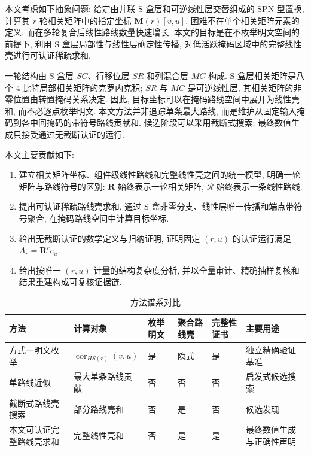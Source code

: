 \documentclass[UTF8,a4paper,zihao=-4,fontset=fandol]{ctexart}
\numberwithin{equation}{section}
\theoremstyle{definition}
\theoremstyle{plain}
\theoremstyle{remark}
\newcommand{\Route}{\mathcal{R}}
\newcommand{\cor}{\operatorname{cor}}
\begin{document}
本文考虑如下抽象问题: 给定由并联 S 盒层和可逆线性层交替组成的 SPN 型置换, 计算其 $r$ 轮相关矩阵中的指定坐标 $\bm{M}(r)[v,u]$. 困难不在单个相关矩阵元素的定义, 而在多轮复合后线性路线数量快速增长. 本文的目标是在不枚举明文空间的前提下, 利用 S 盒层局部性与线性层确定性传播, 对低活跃掩码区域中的完整线性壳进行可认证稀疏求和.

一轮结构由 S 盒层 $SC$、行移位层 $SR$ 和列混合层 $MC$ 构成. S 盒层相关矩阵是八个 4 比特局部相关矩阵的克罗内克积; $SR$ 与 $MC$ 是可逆线性层, 其相关矩阵的非零位置由转置掩码关系决定. 因此, 目标坐标可以在掩码路线空间中展开为线性壳和, 而不必逐点枚举明文. 本文方法并非追踪单条最大路线, 而是维护从固定输入掩码到各中间掩码的带符号路线贡献和. 候选阶段可以采用截断式搜索; 最终数值生成只接受通过无截断认证的运行.

本文主要贡献如下:
\begin{enumerate}[label=\arabic*.,leftmargin=2.8em,itemsep=0.2em]
  \item 建立相关矩阵坐标、组件级线性路线和完整线性壳之间的统一模型, 明确一轮矩阵与路线符号的区别: $\bm{R}$ 始终表示一轮相关矩阵, $\Route$ 始终表示一条线性路线.
  \item 提出可认证稀疏路线壳求和, 通过 S 盒非零分支、线性层唯一传播和端点带符号聚合, 在掩码路线空间中计算目标坐标.
  \item 给出无截断认证的数学定义与归纳证明, 证明固定 $(r,u)$ 的认证运行满足 $A_r=\bm{R}^r e_u$.
  \item 给出按唯一 $(r,u)$ 计量的结构复杂度分析, 并以全量审计、精确抽样复核和结果重建构成可复核证据链.
\end{enumerate}

\begin{table}[H]
\centering
\caption{方法谱系对比}
\label{tab:method-spectrum}
\begin{tabularx}{\textwidth}{C{2.8cm}L C{1.7cm} C{1.9cm} C{2.1cm} L}
\toprule
方法 & 计算对象 & 枚举明文 & 聚合路线壳 & 完整性证书 & 主要用途 \\
\midrule
方式一明文枚举 & $\cor_{HS(r)}(v,u)$ & 是 & 隐式 & 是 & 独立精确验证基准 \\
单路线近似 & 最大单条路线贡献 & 否 & 否 & 否 & 启发式候选搜索 \\
截断式路线壳搜索 & 部分路线壳和 & 否 & 是 & 否 & 候选发现 \\
本文可认证完整路线壳求和 & 完整线性壳和 & 否 & 是 & 是 & 最终数值生成与正确性声明 \\
\bottomrule
\end{tabularx}
\end{table}
\end{document}
